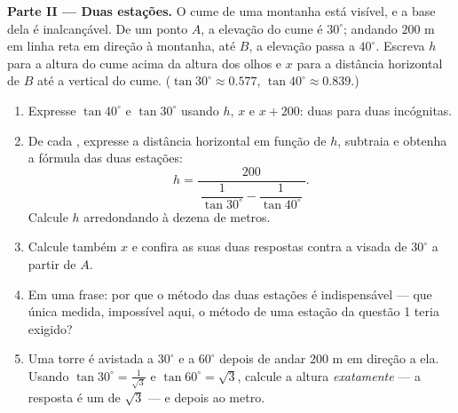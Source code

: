 \begin{problem}
\medskip
\noindent\textbf{Parte II --- Duas estações.}
O cume de uma montanha está visível, e a base dela é inalcançável. De
um ponto $A$, a elevação do cume é $30^\circ$; andando $200$ m em linha
reta em direção à montanha, até $B$, a elevação passa a $40^\circ$.
Escreva $h$ para a altura do cume acima da altura dos olhos e $x$ para
a distância horizontal de $B$ até a vertical do cume.
($\tan 30^\circ \approx 0.577$, $\tan 40^\circ \approx 0.839$.)
\begin{enumerate}[resume]
  \item Expresse $\tan 40^\circ$ e $\tan 30^\circ$ usando $h$, $x$ e
        $x + 200$: duas  para duas incógnitas.
  \item De cada , expresse a distância horizontal em função de
        $h$, subtraia e obtenha a fórmula das duas estações:
        \[
        h = \frac{200}
        {\ \dfrac{1}{\tan 30^\circ} - \dfrac{1}{\tan 40^\circ}\ } .
        \]
        Calcule $h$ arredondando à dezena de metros.
  \item Calcule também $x$ e confira as suas duas respostas contra a
        visada de $30^\circ$ a partir de $A$.
  \item Em uma frase: por que o método das duas estações é
        indispensável --- que única medida, impossível aqui, o método
        de uma estação da questão 1 teria exigido?
  \item Uma torre é avistada a $30^\circ$ e a $60^\circ$ depois de
        andar $200$ m em direção a ela. Usando
        $\tan 30^\circ = \frac{1}{\sqrt3}$ e
        $\tan 60^\circ = \sqrt3$, calcule a altura \emph{exatamente}
        --- a resposta é um  de $\sqrt3$ --- e depois ao metro.
\end{enumerate}


\end{problem}
